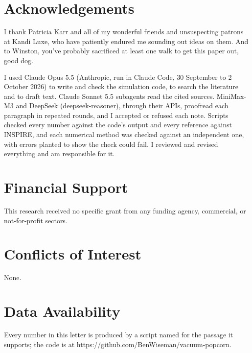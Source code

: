 \documentclass[10pt,twocolumn,a4paper]{article}
\begin{document}
\section*{Acknowledgements}

I thank Patricia Karr and all of my wonderful friends and unsuspecting patrons at Kandi Luxe, who
have patiently endured me sounding out ideas on them. And to Winston, you've probably sacrificed at
least one walk to get this paper out, good dog.

I used Claude Opus 5.5 (Anthropic, run in Claude Code, 30 September to 2 October 2026) to write and
check the simulation code, to search the literature and to draft text. Claude Sonnet 5.5 subagents
read the cited sources. MiniMax-M3 and DeepSeek (deepseek-reasoner), through their APIs, proofread
each paragraph in repeated rounds, and I accepted or refused each note. Scripts checked every number
against the code's output and every reference against INSPIRE, and each numerical method was checked
against an independent one, with errors planted to show the check could fail. I reviewed and revised
everything and am responsible for it.

\section*{Financial Support}

This research received no specific grant from any funding agency, commercial, or not-for-profit
sectors.

\section*{Conflicts of Interest}

None.

\section*{Data Availability}

Every number in this letter is produced by a script named for the passage it supports; the code is
at https://github.com/BenWiseman/vacuum-popcorn.


\end{document}
